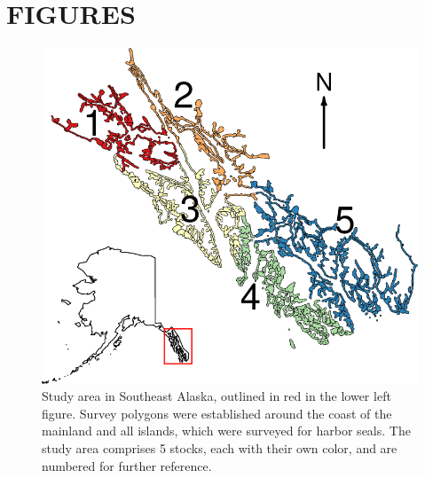 \documentclass[11pt, titlepage]{article}\usepackage[]{graphicx}\usepackage[]{color}
\begin{document}
\begin{spacing}{1.9}
\begin{flushleft}
\begin{table}[ht]
\begin{center}
\begin{tabular}{c|rr|rr|rr|rr}
\end{tabular}
\end{center}
\end{table}



\clearpage


\section*{FIGURES}



\begin{figure}[H]
  \begin{center}
  \includegraphics[width=\linewidth]{figure/Fig-Stocks.png}
  \end{center}
  \caption{Study area in Southeast Alaska, outlined in red in the lower left figure.  Survey polygons were established around the coast of the mainland and all islands, which were surveyed for harbor seals.  The study area comprises 5 stocks, each with their own color, and are numbered for further reference.  \label{Fig-Stocks}}         
\end{figure}


\end{flushleft}
\end{spacing}
\end{document}
